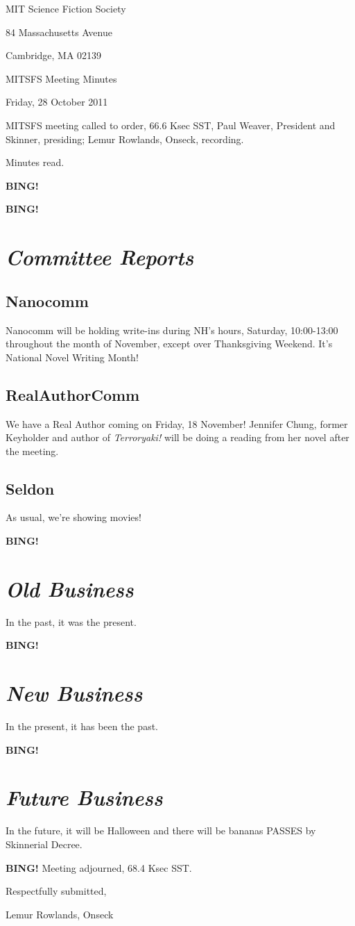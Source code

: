 \documentclass[10pt]{article}
\newcommand{\bing}{{\bf BING!} }
\newcommand{\goto}[1]{\bing \vskip 12pt \section*{{\em{#1}}}}
\newcommand{\skinner}{Paul Weaver, President and Skinner}
\newcommand{\onseck}{Lemur Rowlands, Onseck}
\newcommand{\meetingdate}{Friday, 28 October 2011}
\begin{document}
\begin{center}

MIT Science Fiction Society

84 Massachusetts Avenue

Cambridge, MA 02139

\vspace{12pt}

MITSFS Meeting Minutes

\meetingdate

\end{center}

\vspace{18pt}

\setlength{\parskip}{6pt}

\noindent
MITSFS meeting called to order, 66.6 Ksec SST,
\skinner, presiding; \onseck, recording.

Minutes read.

\bing

\goto{Committee Reports}

\subsection*{Nanocomm}

Nanocomm will be holding write-ins during NH's hours, Saturday, 10:00-13:00 throughout
the month of November, except over Thanksgiving Weekend.  It's National Novel Writing Month!

\subsection*{RealAuthorComm}

We have a Real Author coming on Friday, 18 November!  Jennifer Chung,
former Keyholder and author of \emph{Terroryaki!} will be doing a reading from
her novel after the meeting.

\subsection*{Seldon}

As usual, we're showing movies!

\goto{Old Business}

In the past, it was the present.

\goto{New Business}

In the present, it has been the past.

\goto{Future Business}

In the future, it will be Halloween and there will be bananas PASSES by Skinnerial Decree.

\bing
\noindent
Meeting adjourned, 68.4 Ksec SST.

\vspace{18pt}

\centerline{Respectfully submitted,}
\centerline{\onseck}
\end{document}
